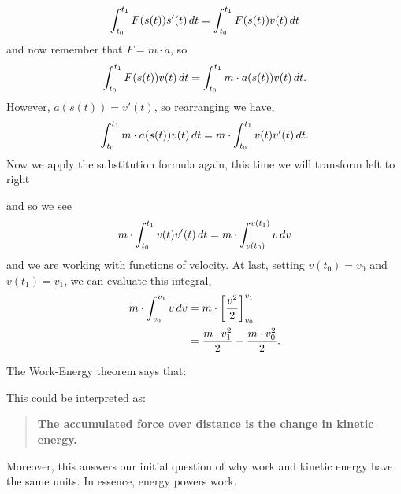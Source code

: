 \documentclass{ximera}
\begin{document}
\begin{theorem}
\begin{explanation}
    \[
    \int_{t_0}^{t_1} F(s(t)) s'(t) \,d t = \int_{t_0}^{t_1} F(s(t)) v(t) \,d t
    \]
    and now remember that $F=m\cdot a$, so
    \[
    \int_{t_0}^{t_1} F(s(t)) v(t) \,d t = \int_{t_0}^{t_1} m\cdot a(s(t)) v(t) \,d t.
    \]
    However, $a(s(t)) = v'(t)$, so rearranging we have,
    \[
    \int_{t_0}^{t_1} m\cdot a(s(t)) v(t) \,d t = m\cdot \int_{t_0}^{t_1} v(t) v'(t)\,d t.
    \]
    Now we apply the substitution formula again, this time we will transform left to right
    \begin{image}
    \end{image}
    and so we see
    \[
    m\cdot \int_{t_0}^{t_1} v(t) v'(t)\,d t = m\cdot \int_{v(t_0)}^{v(t_1)} v \,d v
    \]
    and we are working with functions of velocity.  At last, setting
    $v(t_0) = v_0$ and $v(t_1) = v_1$, we can evaluate this integral,
    \begin{align*}
      m \cdot \int_{v_0}^{v_1} v \,d v &= m \cdot \bigg[ \frac{v^2}{2} \bigg]_{v_0}^{v_1}\\
      &=\frac{m\cdot v_1^2}{2} - \frac{m\cdot v_0^2}{2}.
    \end{align*}
  \end{explanation}
\end{theorem}

The Work-Energy theorem says that:
\begin{image}
\end{image}
This could be interpreted as:
\begin{quote}
  \large\textbf{The \textcolor{green!70!black!70!blue}{accumulated} \textcolor{purple!50!blue!90!black}{force} \textcolor{green!70!black!70!blue}{over distance} is the \textcolor{blue!70!green}{change in kinetic energy}.}
\end{quote}
Moreover, this answers our initial question of why work and kinetic
energy have the same units.  In essence, energy powers work.
\end{document}

